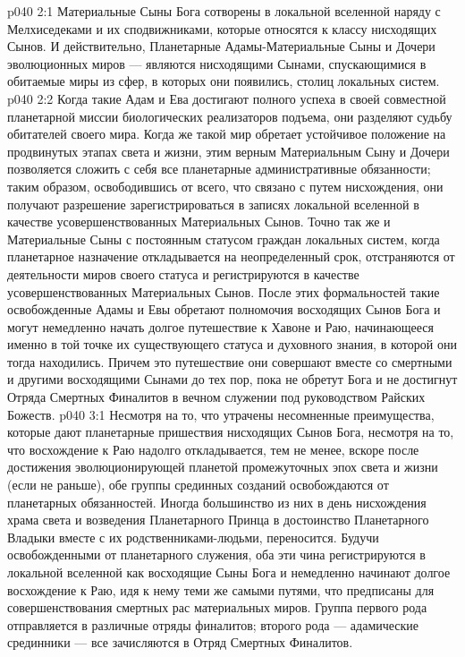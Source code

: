 \vs p040 2:1 Материальные Сыны Бога сотворены в локальной вселенной наряду с Мелхиседеками и их сподвижниками, которые относятся к классу нисходящих Сынов. И действительно, Планетарные Адамы\hyp{}Материальные Сыны и Дочери эволюционных миров --- являются нисходящими Сынами, спускающимися в обитаемые миры из сфер, в которых они появились, столиц локальных систем.
\vs p040 2:2 Когда такие Адам и Ева достигают полного успеха в своей совместной планетарной миссии биологических реализаторов подъема, они разделяют судьбу обитателей своего мира. Когда же такой мир обретает устойчивое положение на продвинутых этапах света и жизни, этим верным Материальным Сыну и Дочери позволяется сложить с себя все планетарные административные обязанности; таким образом, освободившись от всего, что связано с путем нисхождения, они получают разрешение зарегистрироваться в записях локальной вселенной в качестве усовершенствованных Материальных Сынов. Точно так же и Материальные Сыны с постоянным статусом граждан локальных систем, когда планетарное назначение откладывается на неопределенный срок, отстраняются от деятельности миров своего статуса и регистрируются в качестве усовершенствованных Материальных Сынов. После этих формальностей такие освобожденные Адамы и Евы обретают полномочия восходящих Сынов Бога и могут немедленно начать долгое путешествие к Хавоне и Раю, начинающееся именно в той точке их существующего статуса и духовного знания, в которой они тогда находились. Причем это путешествие они совершают вместе со смертными и другими восходящими Сынами до тех пор, пока не обретут Бога и не достигнут Отряда Смертных Финалитов в вечном служении под руководством Райских Божеств.
\vs p040 3:1 Несмотря на то, что утрачены несомненные преимущества, которые дают планетарные пришествия нисходящих Сынов Бога, несмотря на то, что восхождение к Раю надолго откладывается, тем не менее, вскоре после достижения эволюционирующей планетой промежуточных эпох света и жизни (если не раньше), обе группы срединных созданий освобождаются от планетарных обязанностей. Иногда большинство из них в день нисхождения храма света и возведения Планетарного Принца в достоинство Планетарного Владыки вместе с их родственниками\hyp{}людьми, переносится. Будучи освобожденными от планетарного служения, оба эти чина регистрируются в локальной вселенной как восходящие Сыны Бога и немедленно начинают долгое восхождение к Раю, идя к нему теми же самыми путями, что предписаны для совершенствования смертных рас материальных миров. Группа первого рода отправляется в различные отряды финалитов; второго рода --- адамические срединники --- все зачисляются в Отряд Смертных Финалитов.
